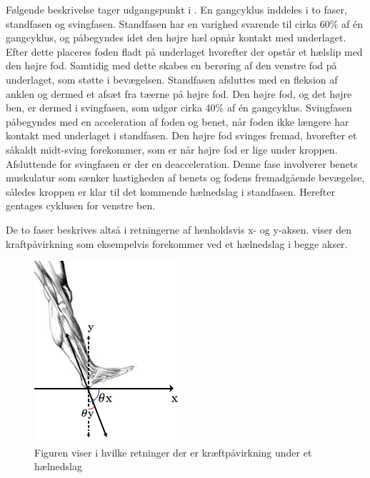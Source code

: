Følgende beskrivelse tager udgangspunkt i . En gangcyklus inddeles i to faser, standfasen og svingfasen.
Standfasen har en varighed svarende til cirka 60\% af én gangcyklus, og påbegyndes idet den højre hæl opnår kontakt med underlaget. Efter dette placeres foden fladt på underlaget hvorefter der opstår et hælslip med den højre fod. Samtidig med dette skabes en berøring af den venstre fod på underlaget, som støtte i bevægelsen. Standfasen afsluttes med en fleksion af anklen og dermed et afsæt fra tæerne på højre fod.\citep{VaughanDavisOConnor1992,Whittle1990}  \newline 
Den højre fod, og det højre ben, er dermed i svingfasen, som udgør cirka 40\% af én gangcyklus. Svingfasen påbegyndes med en acceleration af foden og benet, når foden ikke længere har kontakt med underlaget i standfasen. Den højre fod svinges fremad, hvorefter et såkaldt midt-sving forekommer, som er når højre fod er lige under kroppen. Afsluttende for svingfasen er der en deacceleration. Denne fase involverer benets muskulatur som sænker hastigheden af benets og fodens fremadgående bevægelse, således kroppen er klar til det kommende hælnedslag i standfasen. Herefter gentages cyklusen for venstre ben.\citep{VaughanDavisOConnor1992,Whittle1990}

De to faser beskrives altså i retningerne af henholdsvis x- og y-aksen.  viser den kraftpåvirkning som eksempelvis forekommer ved et hælnedslag i begge akser.  

\begin{figure}[H]
	\centering
	\includegraphics[scale=0.7]{figures/bProblemloesning/kraefter_akser.png}
	\caption{Figuren viser i hvilke retninger der er kræftpåvirkning under et hælnedslag}
	\label{fig:kraefter_akser}
\end{figure}


